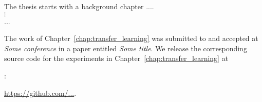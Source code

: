\label{chap:introduction}

\label{sec:overview}

The thesis starts with a background chapter ....
\vspace{7pt}\\
$\vdots$\\
...

\label{sec:code_and_publications}

The work of Chapter~\ref{chap:transfer_learning} was submitted to and accepted at \textit{Some conference} in a paper entitled \textit{Some title}.
We release the corresponding source code for the experiments in Chapter~\ref{chap:transfer_learning} at {:\par \centering \url{https://github.com/...}. \par\vspace{0.5em}} 

